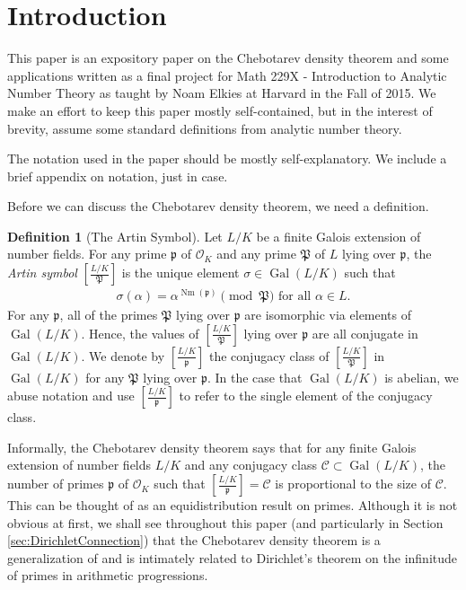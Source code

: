\documentclass[12pt]{amsart}
\theoremstyle{definition}
\newtheorem{definition}[thm]{Definition}
\theoremstyle{remark}
\numberwithin{equation}{section}
\newcommand{\cC}{\mathcal C}
\newcommand{\cO}{\mathcal O}
\newcommand{\fkp}{\mathfrak p}
\newcommand{\fkP}{\mathfrak{P}}
\DeclareMathOperator{\norm}{Nm}
\newcommand{\artin}[2]{\left[ \frac{#1}{#2}\right]}
\DeclareMathOperator{\Gal}{Gal}
\begin{document}
 \maketitle


 \tableofcontents
 
\section{Introduction}

This paper is an expository paper on the Chebotarev density theorem and some applications written as a final project for Math 229X - Introduction to Analytic Number Theory as taught by Noam Elkies at Harvard in the Fall of 2015. We make an effort to keep this paper mostly self-contained, but in the interest of brevity, assume some standard definitions from analytic number theory.

The notation used in the paper should be mostly self-explanatory. We include a brief appendix on notation, just in case. 

Before we can discuss the Chebotarev density theorem, we need a definition.

\begin{definition}[The Artin Symbol]\label{def:ArtinSymbol}
Let $L/K$ be a finite Galois extension of number fields. For any prime $\fkp$ of $\cO_{K}$ and any prime $\fkP$ of $L$ lying over $\fkp$, the \emph{Artin symbol} $\artin{L/K}{\fkP}$ is the unique element $\sigma \in \Gal(L/K)$ such that
\begin{align}
\sigma(\alpha) = \alpha^{\norm(\fkp)} \pmod{\fkP} \text{ for all } \alpha \in L.
\end{align}
For any $\fkp$, all of the primes $\fkP$ lying over $\fkp$ are isomorphic via elements of $\Gal(L/K)$. Hence, the values of $\artin{L/K}{\fkP}$ lying over $\fkp$ are all conjugate in $\Gal(L/K)$. We denote by $\artin{L/K}{\fkp}$ the conjugacy class of $\artin{L/K}{\fkP}$ in $\Gal(L/K)$ for any $\fkP$ lying over $\fkp$. In the case that $\Gal(L/K)$ is abelian, we abuse notation and use $\artin{L/K}{\fkp}$ to refer to the single element of the conjugacy class.
\end{definition}

Informally, the Chebotarev density theorem says that for any finite Galois extension of number fields $L/K$ and any conjugacy class $\cC \subset \Gal(L/K)$, the number of primes $\fkp$ of $\cO_{K}$ such that $\artin{L/K}{\fkp} = \cC$ is proportional to the size of $\cC$. This can be thought of as an equidistribution result on primes. Although it is not obvious at first, we shall see throughout this paper (and particularly in Section \ref{sec:DirichletConnection}) that the Chebotarev density theorem is a generalization of and is intimately related to Dirichlet's theorem on the infinitude of primes in arithmetic progressions.
\end{document}
